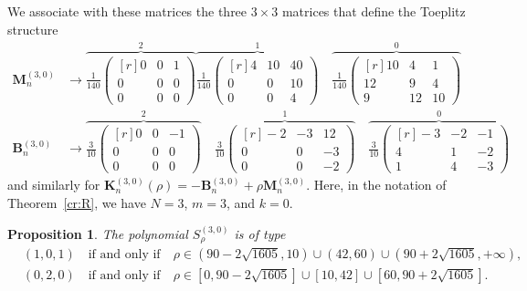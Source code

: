 \documentclass[addpoints,12pt,letter]{article}
\newcommand{\nf}{\infty}
\newcommand{\SR}{S}
\numberwithin{equation}{section}
\newtheorem{proposition}[lemma]{Proposition}
\theoremstyle{definition}
\begin{document}
We associate with these matrices the three $3\times 3$ matrices that define the Toeplitz structure
\begin{align}\label{eq:416}
\mathbf{M}_{n}^{(3,0)} &\to
\overbrace{\frac{1}{140}\begin{pmatrix}[r]
0 & 0 & 1
\\ 0 & 0 & 0
\\ 0 & 0 & 0
\end{pmatrix}}^{2}
\overbrace{\frac{1}{140}\begin{pmatrix}[r]
4 & 10 & 40
\\ 0 & 0 & 10
\\ 0 & 0 & 4
\end{pmatrix}}^{1}
\quad
\overbrace{\frac{1}{140}\begin{pmatrix}[r]
10 & 4 & 1
\\ 12 & 9 & 4
\\ 9 & 12 & 10
\end{pmatrix}}^{0}
\\
\mathbf{B}_{n}^{(3,0)} &\to
\overbrace{\frac{3}{10}\begin{pmatrix}[r]
0 & 0 &-1
\\ 0 & 0 & 0
\\ 0 & 0 & 0
\end{pmatrix}}^{2}
\quad
\overbrace{\frac{3}{10}\begin{pmatrix}[r]
-2 &-3 & 12
\\ 0 & 0 &-3
\\ 0 & 0 &-2
\end{pmatrix}}^{1}
\quad
\overbrace{\frac{3}{10}\begin{pmatrix}[r]
-3 &-2 &-1
\\ 4 & 1 &-2
\\ 1 & 4 &-3
\end{pmatrix}}^{0}
\label{eq:417}
\end{align}
and similarly for $\mathbf{K}_{n}^{(3,0)}(\rho)=-\mathbf{B}_{n}^{(3,0)}+\rho\mathbf{M}_{n}^{(3,0)}$.
Here, in the notation of Theorem~\ref{cr:R}, we have $N=3$, $m=3$, and $k=0$.

\begin{proposition} \label{prop:53}
The polynomial $\SR_{\rho}^{(3,0)}$ is of type
\begin{align*}
&(1,0,1)\quad\text{if and only if}\quad\rho\in (90-2\sqrt{1605},10)\cup (42,60)\cup (90+2\sqrt{1605},+\nf),\\
&(0,2,0)\quad\text{if and only if}\quad\rho\in [0,90-2\sqrt{1605}]\cup [10,42]\cup [60,90+2\sqrt{1605}].
\end{align*}
\end{proposition}
\end{document}
